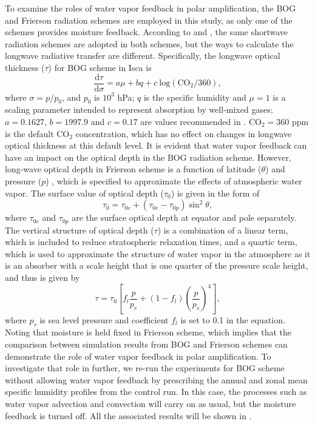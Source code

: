 To examine the roles of water vapor feedback in polar amplification, the BOG and Frierson radiation schemes are employed in this study, as only one of the schemes provides moisture feedback. According to \cite{Byrne2013} and \cite{Frierson2006}, the same shortwave radiation schemes are adopted in both schemes, but the ways to calculate the longwave radiative transfer are different. Specifically, the longwave optical thickness ($\tau$) for BOG scheme in Isca is
\begin{equation}\label{eq:bog_tau}
    \frac{\text{d}\tau}{\text{d}\sigma}=a\mu+bq+c~\text{log}(\text{CO}_2/360),
\end{equation}
where $\sigma = p/p_0$, and $p_0$ is $10^3$ hPa; $q$ is the specific humidity and $\mu=1$ is a scaling parameter intended to represent absorption by well-mixed gases; $a=0.1627$, $b=1997.9$ and $c=0.17$ are values recommended in \cite{Vallis2018}. CO$_2=360$ ppm is the default CO$_2$ concentration, which has no effect on changes in longwave optical thickness at this default level. It is evident that water vapor feedback can have an impact on the optical depth in the BOG radiation scheme. However, long-wave optical depth in Frierson scheme is a function of latitude ($\theta$) and pressure ($p$) \citep{Frierson2006}, which is specified to approximate the effects of atmospheric water vapor. The surface value of optical depth ($\tau_0$) is given in the form of
\begin{equation}\label{eq:frierson_lw_optical_depth1}
\tau_0 = \tau_{0e}+(\tau_{0e}-\tau_{0p})\operatorname{sin}^2\theta,
\end{equation}
where $\tau_{0e}$ and $\tau_{0p}$ are the surface optical depth at equator and pole separately. The vertical structure of optical depth ($\tau$) is a combination of a linear term, which is included to reduce stratospheric relaxation times, and a quartic term, which is used to approximate the structure of water vapor in the atmosphere as it is an absorber with a scale height that is one quarter of the pressure scale height, and thus is given by
\begin{equation}\label{eq:frierson_lw_optical_depth2}
\tau=\tau_0\left[f_l\frac{p}{p_s}+(1-f_l)\left(\frac{p}{p_s}\right)^4\right],
\end{equation}
where $p_s$ is sea level pressure and coefficient $f_l$ is set to 0.1 in the equation. Noting that moisture is held fixed in Frierson scheme, which implies that the comparison between simulation results from BOG and Frierson schemes can demonstrate the role of water vapor feedback in polar amplification. To investigate that role in further, we re-run the experiments for BOG scheme without allowing water vapor feedback by prescribing the annual and zonal mean specific humidity profiles from the control run. In this case, the processes such as water vapor advection and convection will carry on as usual, but the moisture feedback is turned off. All the associated results will be shown in .

